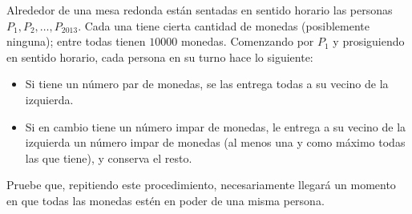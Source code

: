 Alrededor de una mesa redonda están sentadas en sentido horario las personas $P_1,P_2,\ldots,P_{2013}$. Cada una tiene cierta cantidad de monedas (posiblemente ninguna); entre todas tienen $10000$ monedas. Comenzando por $P_1$ y prosiguiendo en sentido horario, cada persona en su turno hace lo siguiente:
\begin{itemize}
\item Si tiene un número par de monedas, se las entrega todas a su vecino de la izquierda.
\item Si en cambio tiene un número impar de monedas, le entrega a su vecino de la izquierda un número impar de monedas (al menos una y como máximo todas las que tiene), y conserva el resto.
\end{itemize}
Pruebe que, repitiendo este procedimiento, necesariamente llegará un momento en que todas las monedas estén en poder de una misma persona.
